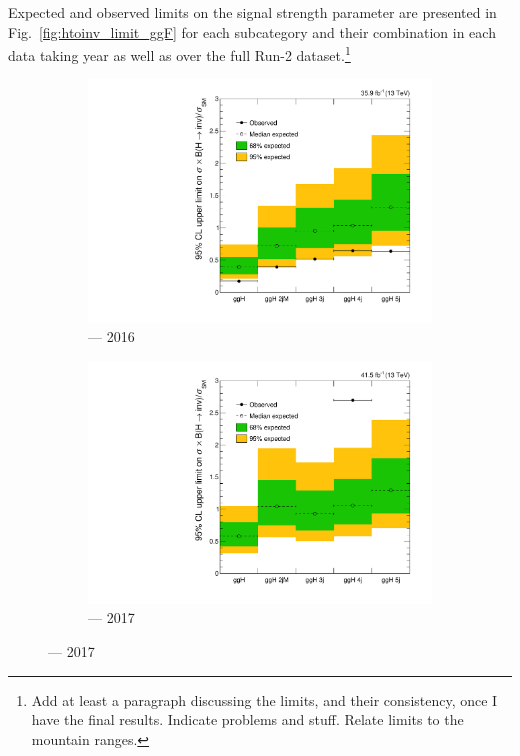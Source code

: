 Expected and observed limits on the signal strength parameter are presented in Fig.~\ref{fig:htoinv_limit_ggF} for each \ggH subcategory and their combination in each data taking year as well as over the full Run-2 dataset.\footnote{Add at least a paragraph discussing the limits, and their consistency, once I have the final results. Indicate problems and stuff. Relate limits to the mountain ranges.}

\begin{figure}[htbp]
    \centering
    \begin{subfigure}[b]{0.45\textwidth}
        \includegraphics[width=\textwidth]{figures/limits/ggF/limit_2016_ggF.pdf}
        \caption{\ggH --- 2016}
    \end{subfigure}
    \hfill
    \begin{subfigure}[b]{0.45\textwidth}
        \includegraphics[width=\textwidth]{figures/limits/ggF/limit_2017_ggF.pdf}
        \caption{\ggH --- 2017}
    \end{subfigure}


\end{figure}
